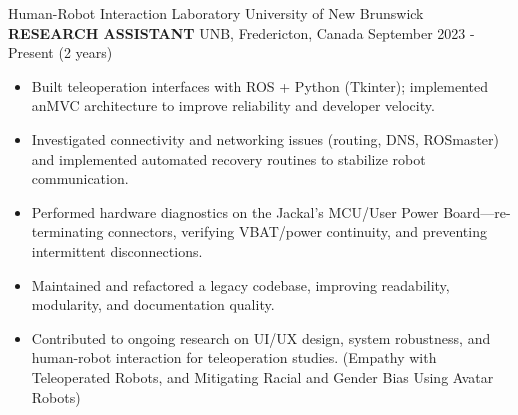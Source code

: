 
\begin{cventries}
    \cventry
    {Human-Robot Interaction Laboratory \textemdash University of New Brunswick}
    {\textbf{RESEARCH ASSISTANT}}
    {UNB, Fredericton, Canada}
    {September 2023 - Present (2 years)}
    {
        \begin{itemize}
            \item Built teleoperation interfaces with ROS + Python (Tkinter); implemented anMVC architecture to improve reliability and developer velocity.
            \item Investigated connectivity and networking issues (routing, DNS, ROSmaster) and implemented automated recovery routines to stabilize robot communication.
            \item Performed hardware diagnostics on the Jackal’s MCU/User Power Board—re-terminating connectors, verifying VBAT/power continuity, and preventing intermittent disconnections.
            \item Maintained and refactored a legacy codebase, improving readability, modularity, and documentation quality.
            \item Contributed to ongoing research on UI/UX design, system robustness, and human-robot interaction for teleoperation studies. (Empathy with Teleoperated Robots, and Mitigating Racial and Gender Bias Using Avatar Robots)
        \end{itemize}}
    \vspace{0.4 cm}
\end{cventries}



